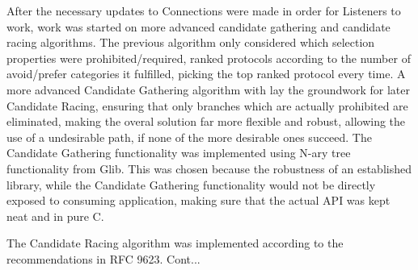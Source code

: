 After the necessary updates to Connections were made in order
for Listeners to work, work was started on more advanced candidate
gathering and candidate racing algorithms. The previous algorithm
only considered which selection properties were prohibited/required,
ranked protocols according to the number of avoid/prefer categories
it fulfilled, picking the top ranked protocol every time. A more advanced
Candidate Gathering algorithm with lay the groundwork for later Candidate
Racing, ensuring that only branches which are actually prohibited are
eliminated, making the overal solution far more flexible and robust,
allowing the use of a undesirable path, if none of the more desirable
ones succeed. The Candidate Gathering functionality was implemented using
N-ary tree functionality from Glib. This was chosen because the robustness
of an established library, while the Candidate Gathering functionality would
not be directly exposed to consuming application, making sure that the
actual API was kept neat and in pure C.

The Candidate Racing algorithm was implemented according to the recommendations
in RFC 9623. Cont...
